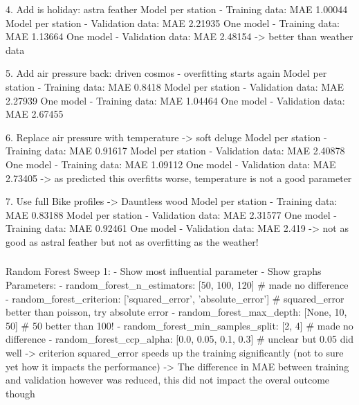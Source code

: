 \documentclass{article}
\begin{document}
{{{{{{{{                                4. Add is holiday: astra feather
                                Model per station - Training data: MAE 1.00044
                                Model per station - Validation data: MAE 2.21935
                                One model - Training data: MAE 1.13664
                                One model - Validation data: MAE 2.48154
                                -> better than weather data

                                5. Add air pressure back: driven cosmos - overfitting starts again
                                Model per station - Training data: MAE 0.8418
                                Model per station - Validation data: MAE 2.27939
                                One model - Training data: MAE 1.04464
                                One model - Validation data: MAE 2.67455


                                6. Replace air pressure with temperature -> soft deluge
                                Model per station - Training data: MAE 0.91617
                                Model per station - Validation data: MAE 2.40878
                                One model - Training data: MAE 1.09112
                                One model - Validation data: MAE 2.73405
                                -> as predicted this overfitts worse, temperature is not a good parameter

                                7. Use full Bike profiles -> Dauntless wood
                                Model per station - Training data: MAE 0.83188
                                Model per station - Validation data: MAE 2.31577
                                One model - Training data: MAE 0.92461
                                One model - Validation data: MAE 2.419
                                -> not as good as astral feather but not as overfitting as the weather!


                                \subsubsection*{}

                                Random Forest Sweep 1:
                                - Show most influential parameter
                                - Show graphs
                                Parameters:
                                - random\_forest\_n\_estimators:  [50, 100, 120] # made no difference
                                - random\_forest\_criterion: ['squared\_error', 'absolute\_error']  # squared\_error better than poisson, try absolute error
                                - random\_forest\_max\_depth: [None, 10, 50]  # 50 better than 100!
                                - random\_forest\_min\_samples\_split: [2, 4] # made no difference
                                - random\_forest\_ccp\_alpha: [0.0, 0.05, 0.1, 0.3]  # unclear but 0.05 did well
                                -> criterion squared\_error speeds up the training significantly (not to sure yet how it impacts the performance)
                                -> The difference in MAE between training and validation however was reduced, this did not impact the overal outcome though

}}}}}}}}
\end{document}
